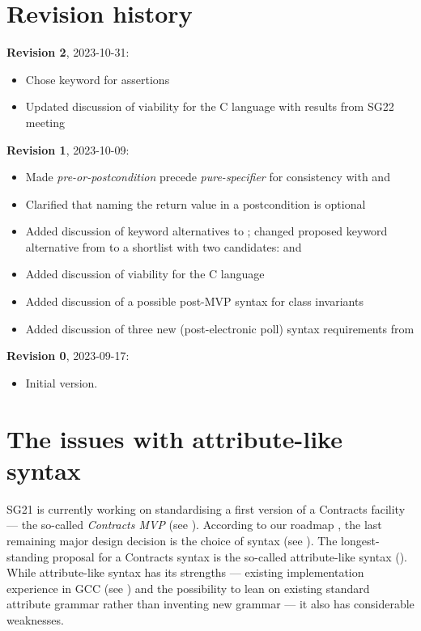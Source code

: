 \section*{Revision history}
\textbf{Revision 2}, 2023-10-31:
\begin{itemize}
\item Chose keyword  for assertions
\item Updated discussion of viability for the C language with results from SG22 meeting
\end{itemize}
\textbf{Revision 1}, 2023-10-09: 
\begin{itemize}
\item Made \emph{pre-or-postcondition} precede \emph{pure-specifier} for consistency with  and 
\item Clarified that naming the return value in a postcondition is optional
\item Added discussion of keyword alternatives to ; changed proposed keyword alternative from  to a shortlist with two candidates:  and 
\item Added discussion of viability for the C language
\item Added discussion of a possible post-MVP syntax for class invariants
\item Added discussion of three new (post-electronic poll) syntax requirements from \cite{P2885R3}
\end{itemize}
\textbf{Revision 0}, 2023-09-17: 
\begin{itemize}
\item Initial version.
\end{itemize}



\section{The issues with attribute-like syntax}
\label{sec:motivation}

SG21 is currently working on standardising a first version of a Contracts facility --- the so-called \emph{Contracts MVP} (see \cite{P2900R0}). According to our roadmap \cite{P2695R1}, the last remaining major design decision is the choice of syntax (see \cite{P2885R3}). The longest-standing proposal for a Contracts syntax is the so-called attribute-like syntax (\cite{P2935R3}). While attribute-like syntax has its strengths --- existing implementation experience in GCC (see \cite{P1680R0}) and the possibility to lean on existing standard attribute grammar rather than inventing new grammar --- it also has considerable weaknesses.

